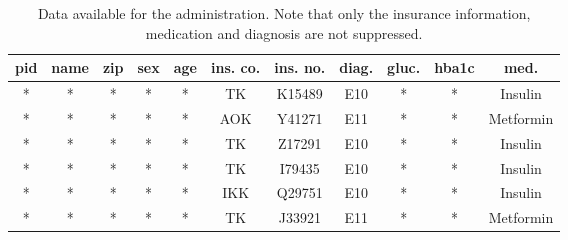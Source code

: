 \begin{table}[ht]
    \begin{center}
    \footnotesize{
        \renewcommand{\arraystretch}{1.5}
        \begin{tabular}{ | c | c | c | c | c | c | c | c | c | c | c | } 
            \hline
            \cellcolor{lightred} pid & \cellcolor{lightred} name & \cellcolor{lightred} zip & \cellcolor{lightred} sex & \cellcolor{lightred} age & ins. co. & ins. no. & diag. & \cellcolor{lightred} gluc. & \cellcolor{lightred} hba1c & med. \\
            \hline
            \cellcolor{lightred} * & \cellcolor{lightred} * & \cellcolor{lightred} * & \cellcolor{lightred} * & \cellcolor{lightred} * & TK & K15489 & E10 & \cellcolor{lightred} * & \cellcolor{lightred} * & Insulin \\
            \hline
            \cellcolor{lightred} * & \cellcolor{lightred} * & \cellcolor{lightred} * & \cellcolor{lightred} * & \cellcolor{lightred} * & AOK & Y41271 & E11 & \cellcolor{lightred} * & \cellcolor{lightred} * & Metformin \\
            \hline 
            \cellcolor{lightred} * & \cellcolor{lightred} * & \cellcolor{lightred} * & \cellcolor{lightred} * & \cellcolor{lightred} * & TK & Z17291 & E10 & \cellcolor{lightred} * & \cellcolor{lightred} * & Insulin \\
            \hline
            \cellcolor{lightred} * & \cellcolor{lightred} * & \cellcolor{lightred} * & \cellcolor{lightred} * & \cellcolor{lightred} * & TK & I79435 & E10 & \cellcolor{lightred} * & \cellcolor{lightred} * & Insulin \\
            \hline
            \cellcolor{lightred} * & \cellcolor{lightred} * & \cellcolor{lightred} * & \cellcolor{lightred} * & \cellcolor{lightred} * & IKK & Q29751 & E10 & \cellcolor{lightred} * & \cellcolor{lightred} * & Insulin \\
            \hline
            \cellcolor{lightred} * & \cellcolor{lightred} * & \cellcolor{lightred} * & \cellcolor{lightred} * & \cellcolor{lightred} * & TK & J33921 & E11 & \cellcolor{lightred} * & \cellcolor{lightred} * & Metformin \\
            \hline
        \end{tabular}
    }
    \caption{Data available for the administration. Note that only the insurance information, medication and diagnosis are not suppressed.}
    \label{table:administration}
    \end{center}
\end{table}

